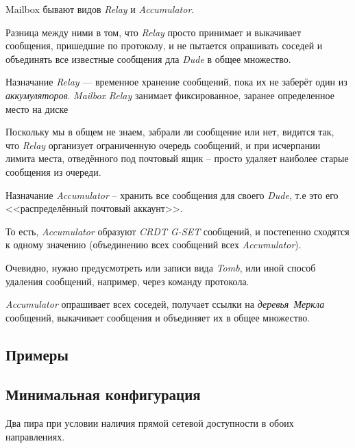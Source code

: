 \documentclass[11pt,a4paper]{article}
\newcommand{\term}[2]{\textit{#2}}
\newcommand{\Relay}{\term{relay}{Relay}}
\newcommand{\Acc}{\term{acc}{Accumulator}}
\newcommand{\Dude}{\term{dude}{Dude}}
\newcommand{\Mailbox}{\term{mailbox}{Mailbox}}
\begin{document}
Mailbox бывают видов \term{Relay}{Relay} и \term{Accumulator}{Accumulator}.

Разница между ними в том, что \Relay{} просто принимает и выкачивает сообщения,
пришедшие по протоколу, и не пытается опрашивать соседей и объединять все
известные сообщения дла \Dude{} в общее множество.

Назначание \Relay{} --- временное хранение сообщений, пока их не заберёт один из
\term{acc}{аккумуляторов}. \Mailbox{} \Relay{} занимает фиксированное, заранее
определенное место на диске

Поскольку мы в общем не знаем, забрали ли сообщение или нет, видится так, что
\Relay{} организует ограниченную очередь сообщений, и при исчерпании лимита
места, отведённого под почтовый ящик -- просто удаляет наиболее старые сообщения
из очереди.

Назначание \Acc{} -- хранить все сообщения для своего \Dude{}, т.е это его
<<распределённый почтовый аккаунт>>.

То есть, \Acc{} образуют \term{GSET}{CRDT G-SET} сообщений, и постепенно
сходятся к одному значению (объединению всех сообщений всех \Acc{}).

Очевидно, нужно предусмотреть или записи вида \textit{Tomb}, или иной способ
удаления сообщений, например, через команду протокола.

\Acc{} опрашивает всех соседей, получает ссылки на \term{merkle}{деревья~Меркла}
сообщений, выкачивает сообщения и объединяет их в общее множество.

\subsection{Примеры}

\subsection*{Минимальная конфигурация}

Два пира при условии наличия прямой сетевой доступности в обоих направлениях.
\end{document}
